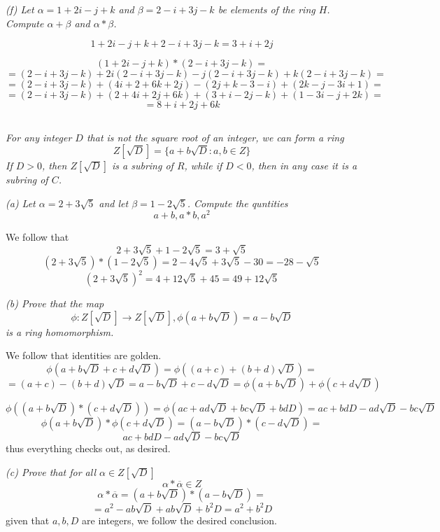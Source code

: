 \documentclass[11pt,oneside,titlepage]{book}
\newcommand{\set}[1]{\{ #1 \}}
\begin{document}
\textit{(f) Let $\alpha = 1 + 2i - j + k$ and $\beta = 2 - i + 3j - k$
be elements of the ring $H$. Compute $\alpha + \beta$ and $\alpha *
\beta$.}

$$1 + 2i - j + k +  2 - i + 3j - k = 3 + i + 2j$$

$$(1 + 2i - j + k) *  (2 - i + 3j - k) = $$
$$ = (2 - i + 3j - k) + 2i(2 - i + 3j - k) - j(2 - i + 3j - k) + k(2 - i + 3j - k) = $$
$$ = (2 - i + 3j - k) + (4i + 2 + 6k + 2j) - (2j + k - 3 - i) + (2k - j - 3i + 1) = $$
$$ = (2 - i + 3j - k) + (2 + 4i + 2j +  6k) + (3 + i - 2j - k) + (1 - 3i - j + 2k) = $$
$$ = 8 + i + 2j + 6k $$

\subsection{}

\textit{For any integer $D$ that is not the square root of an integer,
we can form a ring
  $$Z[\sqrt{D}] = \set{a + b\sqrt{D}: a, b \in Z}$$
  If $D > 0$, then $Z[\sqrt{D}]$ is a subring of $R$, while if $D <
0$, then in any case it is a subring of $C$.}

\textit{(a) Let $\alpha = 2 + 3 \sqrt{5}$ and let $\beta = 1 -
2\sqrt{5}$. Compute the quntities
  $$a + b, a * b, a^2$$}

We follow that
$$2 + 3 \sqrt{5} + 1 - 2 \sqrt{5} = 3 + \sqrt{5}$$
$$(2 + 3 \sqrt{5}) * (1 - 2 \sqrt{5}) = 2 - 4\sqrt{5} + 3 \sqrt{5} - 30 = -28 - \sqrt{5}$$
$$(2 + 3 \sqrt{5})^2 = 4 + 12 \sqrt{5} + 45 = 49 + 12 \sqrt{5}$$

\textit{(b) Prove that the map
  $$\phi: Z[\sqrt{D}] \to Z[\sqrt{D}], \phi(a + b\sqrt{D}) = a - b \sqrt{D}$$
  is a ring homomorphism. }

We follow that identities are golden.
$$\phi(a + b\sqrt{D} + c + d\sqrt{D}) =  \phi((a + c) + (b + d)\sqrt{D}) = $$
$$ = 
(a + c) - (b + d)\sqrt{D} = a - b\sqrt{D} + c - d\sqrt{D} = \phi(a +
b\sqrt{D}) + \phi(c + d\sqrt{D})$$

$$\phi((a + b\sqrt{D}) * (c + d\sqrt{D})) = \phi(ac + ad\sqrt{D} + bc\sqrt{D} + bdD) =
ac + bdD - ad\sqrt{D} - bc\sqrt{D}$$
$$\phi(a + b\sqrt{D}) * \phi(c + d\sqrt{D}) = (a - b\sqrt{D}) * (c - d \sqrt{D}) = $$
$$ ac  + bdD  - ad\sqrt{D} - bc\sqrt{D}$$
thus everything checks out, as desired.

\textit{(c) Prove that for all $\alpha \in Z[\sqrt{D}]$
  $$\alpha *  \overline{\alpha} \in Z$$}
$$\alpha *  \overline{\alpha} = (a + b\sqrt{D}) * (a - b\sqrt{D}) = $$
$$ = a^2 - ab\sqrt{D} + ab\sqrt{D} + b^2D = a^2 + b^2D$$
given that $a, b, D$ are integers, we follow the desired conclusion.
\end{document}
